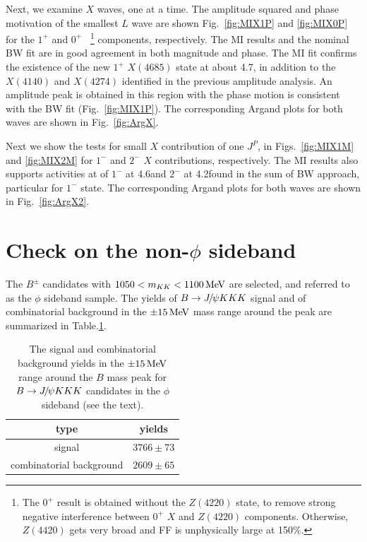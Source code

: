 Next, we examine $X$ waves, one at a time. 
The amplitude squared and phase motivation of the smallest $L$ wave 
are shown Fig.~\ref{fig:MIX1P} and \ref{fig:MIX0P} for the $1^+$ and $0^+$
~\footnote{The $0^+$ result is obtained without the $Z(4220)$ state, to remove strong negative interference between $0^+$ $X$ and $Z(4220)$ components. 
Otherwise, $Z(4420)$ gets very broad and FF is unphysically large at 150\%.} 
components, respectively. 
The MI results and the nominal BW fit are in good agreement in both magnitude and phase. 
The MI fit confirms the existence of the new $1^+$ $X(4685)$ state at about 4.7\gev, 
in addition to the $X(4140)$ and $X(4274)$ identified in the previous amplitude analysis. 
An amplitude peak is obtained in this region with the phase motion is consistent with the BW fit (Fig.~\ref{fig:MIX1P}). 
The corresponding Argand plots for both waves are shown in Fig.~\ref{fig:ArgX}.  

Next we show the tests for small $X$ contribution of one $J^P$, 
in Figs.~\ref{fig:MIX1M} and \ref{fig:MIX2M} for $1^-$ and $2^-$ $X$ contributions, respectively. 
The MI results also supports activities at of $1^-$ at 4.6\gev and $2^-$ at 4.2\gev found in the sum of BW approach, 
particular for $1^-$ state. 
The corresponding Argand plots for both waves are shown in Fig.~\ref{fig:ArgX2}.

\section{Check on the non-$\phi$ sideband}

The $B^{\pm}$ candidates with $1050<m_{KK}<1100 \text{\,Me\kern -0.1em V}$  are selected, and referred to as the $\phi$ sideband sample.
The yields of $B\rightarrow{\ensuremath{{J\mskip -3mu/\mskip -2mu\psi}}} KKK$ signal and of combinatorial background in the $\pm15\text{\,Me\kern -0.1em V}$ mass range around the peak
are summarized in Table.\ref{table:app_phi_sideband_yields}.

\begin{table}[h]
\begin{center}
\caption{The signal and combinatorial background yields in the $\pm15\text{\,Me\kern -0.1em V}$ range around the $B$ mass peak
for $B\rightarrow{\ensuremath{{J\mskip -3mu/\mskip -2mu\psi}}} KKK$ candidates in the $\phi$ sideband (see the text).}
\label{table:app_phi_sideband_yields}
\begin{tabular}{cc}
\hline
 type &  yields \\
\hline
signal & $3766 \pm 73$ \\
combinatorial background & $ 2609 \pm 65$\\
\hline
\end{tabular}
\end{center}
\end{table}


